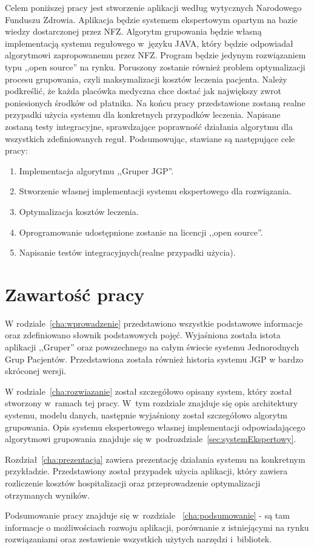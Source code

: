 Celem poniższej pracy jest stworzenie aplikacji według wytycznych Narodowego Funduszu Zdrowia\cite{plik_parametryzujacy}\cite{algorytm_grupera}. Aplikacja będzie systemem ekspertowym opartym na bazie wiedzy dostarczonej przez NFZ\cite{plik_parametryzujacy}. Algorytm grupowania będzie własną implementacją systemu regułowego w~języku JAVA, który będzie odpowiadał algorytmowi zapropowanemu przez NFZ\cite{algorytm_grupera}. Program będzie jedynym rozwiązaniem typu ,,open source'' na rynku. Poruszony zostanie również problem optymalizacji procesu grupowania, czyli maksymalizacji kosztów leczenia pacjenta. Należy podkreślić, że każda placówka medyczna chce dostać jak największy zwrot poniesionych środków od płatnika. Na końcu pracy przedstawione zostaną realne przypadki użycia systemu dla konkretnych przypadków leczenia. Napisane zostaną testy integracyjne, sprawdzające poprawność działania algorytmu dla wszystkich zdefiniowanych reguł. 
Podsumowując, stawiane są następujące cele pracy:
\begin{enumerate}
\item Implementacja algorytmu ,,Gruper JGP''.
\item Stworzenie własnej implementacji systemu ekspertowego dla rozwiązania.
\item Optymalizacja kosztów leczenia.
\item Oprogramowanie udostępnione zostanie na licencji ,,open source''.
\item Napisanie testów integracyjnych(realne przypadki użycia).
\end{enumerate}


\section{Zawartość pracy}
\label{sec:zawartoscPracy}

W rodziale~\ref{cha:wprowadzenie} przedstawiono wszystkie podstawowe informacje oraz zdefiniowano słownik podstawowych pojęć. Wyjaśniona została istota aplikacji ,,Gruper'' oraz powszechnego na całym świecie systemu Jednorodnych Grup Pacjentów. Przedstawiona została również historia systemu JGP w bardzo skróconej wersji.

W rodziale~\ref{cha:rozwiazanie} został szczegółowo opisany system, który został stworzony w~ramach tej pracy. W~tym rozdziale znajduje się opis architektury systemu, modelu danych, następnie wyjaśniony został szczegółowo algorytm grupowania. Opis systemu ekspertowego własnej implementacji odpowiadającego algorytmowi grupowania znajduje się w~podrozdziale~\ref{sec:systemEkspertowy}.

Rozdział~\ref{cha:prezentacja} zawiera prezentację działania systemu na konkretnym przykładzie. Przedstawiony został przypadek użycia aplikacji, który zawiera rozliczenie kosztów hospitalizacji oraz przeprowadzenie optymalizacji otrzymanych wyników.

Podsumowanie pracy znajduje się w~rozdziale ~\ref{cha:podsumowanie} - są tam informacje o możliwościach rozwoju aplikacji, porównanie z istniejącymi na rynku rozwiązaniami oraz zestawienie wszystkich użytych narzędzi i~bibliotek.


